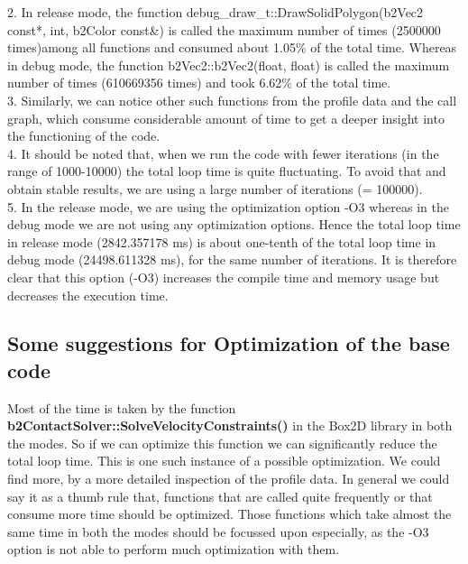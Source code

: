 \documentclass[11pt]{article}
\begin{document}
2. In release mode, the function debug\_draw\_t::DrawSolidPolygon(b2Vec2 const*, int, b2Color const\&) is called the maximum number of times (2500000 times)among all functions and consumed about 1.05\% of the total time. Whereas in debug mode, the function b2Vec2::b2Vec2(float, float) is called the maximum number of times (610669356 times) and took 6.62\% of the total time. \\

3. Similarly, we can notice other such functions from the profile data and the call graph, which consume considerable amount of time to get a deeper insight into the functioning of the code. \\

4. It should be noted that, when we run the code with fewer iterations (in the range of 1000-10000) the total loop time is quite fluctuating. To avoid that and obtain stable results, we are using a large number of iterations (= 100000). \\

5. In the release mode, we are using the optimization option -O3 whereas in the debug mode we are not using any optimization options. Hence the total loop time in release mode (2842.357178 ms) is about one-tenth of the total loop time in debug mode (24498.611328 ms), for the same number of iterations. It is therefore clear that this option (-O3) increases the compile time and memory usage but decreases the execution time.

\subsection{Some suggestions for Optimization of the base code}
Most of the time is taken by the function \textbf{b2ContactSolver::SolveVelocityConstraints()} in the Box2D library in both the modes. So if we can optimize this function we can significantly reduce the total loop time. This is one such instance of a possible optimization. We could find more, by a more detailed inspection of the profile data. In general we could say it as a thumb rule that, functions that are called quite frequently or that consume more time should be optimized. Those functions which take almost the same time in both the modes should be focussed upon especially, as the -O3 option is not able to perform much optimization with them.


\end{document}
